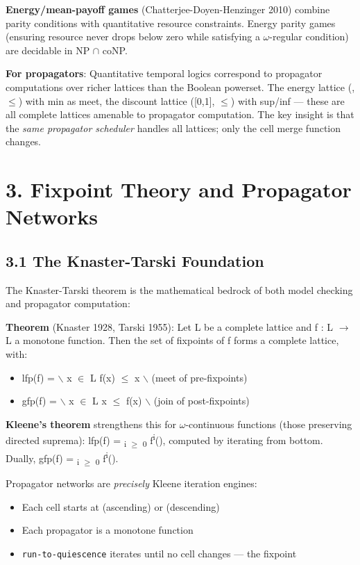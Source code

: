 \documentclass[11pt]{article}
\begin{document}
\textbf{Energy/mean-payoff games} (Chatterjee-Doyen-Henzinger 2010) combine parity
conditions with quantitative resource constraints. Energy parity games
(ensuring resource never drops below zero while satisfying a \(\omega\)-regular
condition) are decidable in NP \(\cap\) coNP.

\textbf{For propagators}: Quantitative temporal logics correspond to propagator
computations over richer lattices than the Boolean powerset. The energy lattice
(, \(\le\)) with min as meet, the discount lattice ([0,1], \(\le\)) with
sup/inf --- these are all complete lattices amenable to propagator computation.
The key insight is that the \emph{same propagator scheduler} handles all lattices;
only the cell merge function changes.
\section{3. Fixpoint Theory and Propagator Networks}
\label{sec:org13c6079}

\subsection{3.1 The Knaster-Tarski Foundation}
\label{sec:orgc0731d4}

The Knaster-Tarski theorem is the mathematical bedrock of both model checking
and propagator computation:

\textbf{Theorem} (Knaster 1928, Tarski 1955): Let L be a complete lattice and
f : L \(\to\) L a monotone function. Then the set of fixpoints of f forms a complete
lattice, with:
\begin{itemize}
\item lfp(f) = \bigcap $\backslash${ x \(\in\) L \mid f(x) \(\le\) x $\backslash$} (meet of pre-fixpoints)
\item gfp(f) = \bigcup $\backslash${ x \(\in\) L \mid x \(\le\) f(x) $\backslash$} (join of post-fixpoints)
\end{itemize}

\textbf{Kleene's theorem} strengthens this for \(\omega\)-continuous functions (those
preserving directed suprema): lfp(f) = \bigsqcup\textsubscript{i \(\ge\) 0} f\textsuperscript{i}(\bot), computed
by iterating from bottom. Dually, gfp(f) = \bigsqcap\textsubscript{i \(\ge\) 0} f\textsuperscript{i}(\top).

Propagator networks are \emph{precisely} Kleene iteration engines:
\begin{itemize}
\item Each cell starts at \bot (ascending) or \top (descending)
\item Each propagator is a monotone function
\item \texttt{run-to-quiescence} iterates until no cell changes --- the fixpoint
\end{itemize}
\end{document}
